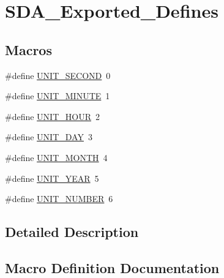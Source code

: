 \hypertarget{group___s_d_a___exported___defines}{}\section{S\+D\+A\+\_\+\+Exported\+\_\+\+Defines}
\label{group___s_d_a___exported___defines}
\subsection*{Macros}
\begin{DoxyCompactItemize}
\item 
\#define \mbox{\hyperlink{group___s_d_a___exported___defines_ga05055f3cee948d8763312327597b6213}{U\+N\+I\+T\+\_\+\+S\+E\+C\+O\+ND}}~0
\item 
\#define \mbox{\hyperlink{group___s_d_a___exported___defines_ga1b18e73a9b9253beff7c7b7a5460748a}{U\+N\+I\+T\+\_\+\+M\+I\+N\+U\+TE}}~1
\item 
\#define \mbox{\hyperlink{group___s_d_a___exported___defines_gaddaea55490fd45135a79081c00a90540}{U\+N\+I\+T\+\_\+\+H\+O\+UR}}~2
\item 
\#define \mbox{\hyperlink{group___s_d_a___exported___defines_ga34ef9d077cc547e8924ee1757f6af738}{U\+N\+I\+T\+\_\+\+D\+AY}}~3
\item 
\#define \mbox{\hyperlink{group___s_d_a___exported___defines_gae7400b9936841b02bf73f866568303b5}{U\+N\+I\+T\+\_\+\+M\+O\+N\+TH}}~4
\item 
\#define \mbox{\hyperlink{group___s_d_a___exported___defines_ga0da03f97aca2c96380d00500a0d2887c}{U\+N\+I\+T\+\_\+\+Y\+E\+AR}}~5
\item 
\#define \mbox{\hyperlink{group___s_d_a___exported___defines_gaafb734a19a4b8eb8798af220955907ce}{U\+N\+I\+T\+\_\+\+N\+U\+M\+B\+ER}}~6
\end{DoxyCompactItemize}


\subsection{Detailed Description}


\subsection{Macro Definition Documentation}
\mbox{\label{group___s_d_a___exported___defines_ga34ef9d077cc547e8924ee1757f6af738}} 
